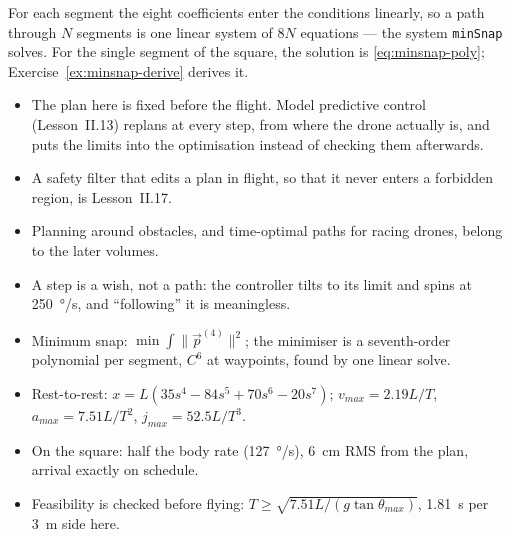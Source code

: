 For each segment the eight coefficients enter the conditions linearly, so a path through $N$ segments is one linear system of $8N$ equations — the system \texttt{minSnap} solves. For the single segment of the square, the solution is \cref{eq:minsnap-poly}; Exercise~\ref{ex:minsnap-derive} derives it.

\begin{lookahead}
\begin{itemize}[leftmargin=1.2em]
  \item The plan here is fixed before the flight. Model predictive control (Lesson~II.13) replans at every step, from where the drone actually is, and puts the limits into the optimisation instead of checking them afterwards.
  \item A safety filter that edits a plan in flight, so that it never enters a forbidden region, is Lesson~II.17.
  \item Planning around obstacles, and time-optimal paths for racing drones, belong to the later volumes.
\end{itemize}
\end{lookahead}

\begin{remember}
\begin{itemize}
  \item A step is a wish, not a path: the controller tilts to its limit and spins at \SI{250}{\degree/s}, and \enquote{following} it is meaningless.
  \item Minimum snap: $\min\int\|\vec p^{(4)}\|^2$; the minimiser is a seventh-order polynomial per segment, $C^6$ at waypoints, found by one linear solve.
  \item Rest-to-rest: $x = L(35s^4 - 84s^5 + 70s^6 - 20s^7)$; $v_{max} = 2.19L/T$, $a_{max} = 7.51L/T^2$, $j_{max} = 52.5L/T^3$.
  \item On the square: half the body rate (\SI{127}{\degree/s}), \SI{6}{cm} RMS from the plan, arrival exactly on schedule.
  \item Feasibility is checked before flying: $T \ge \sqrt{7.51L/(g\tan\theta_{max})}$, \SI{1.81}{s} per \SI{3}{m} side here.
\end{itemize}
\end{remember}

